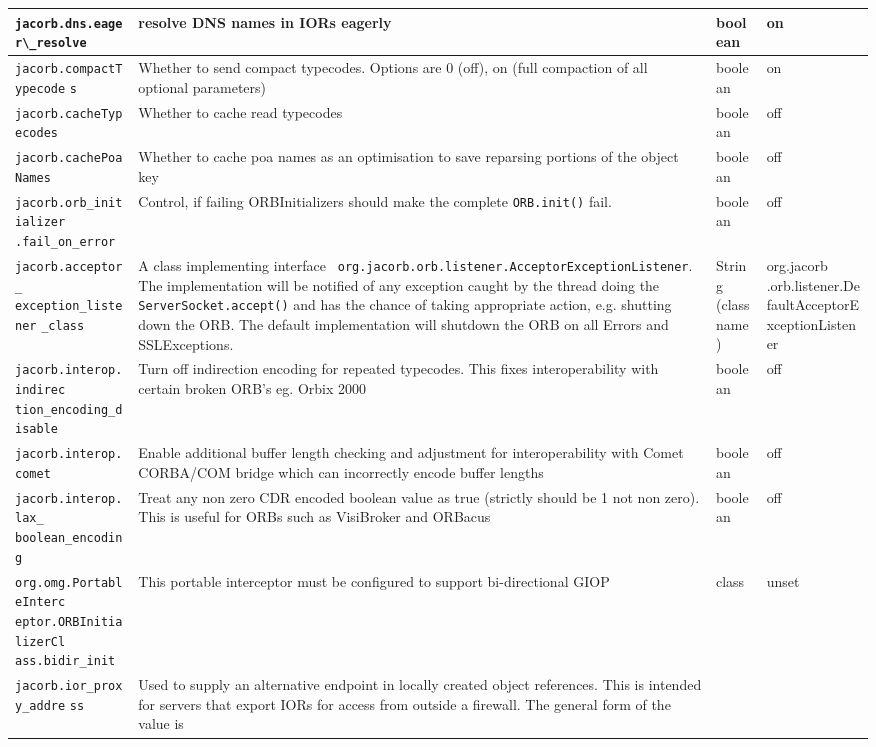{{\begin{small}
\begin{longtable}{|p{5cm}|p{7.5cm}|p{1.5cm}|p{1.5cm}|}
\verb"jacorb.dns.eager\_resolve" & resolve DNS names in IORs eagerly & boolean & on \\
\hline
\verb"jacorb.compactTypecode"
\verb"s" & Whether to send compact typecodes. Options are 0 (off), on (full compaction of all optional parameters) & boolean & on \\
\hline
\verb"jacorb.cacheTypecodes" & Whether to cache read
typecodes  & boolean & off \\
\hline
\verb"jacorb.cachePoaNames" & Whether to cache poa names as an optimisation
to save reparsing portions of the object key& boolean & off \\
\hline
\verb"jacorb.orb_initializer"
\verb".fail_on_error" & Control, if failing ORBInitializers should make the
complete {\tt ORB.init()} fail. & boolean & off \\
\hline
\verb"jacorb.acceptor_"
\verb"exception_listener"
\verb"_class" & A class implementing interface {\tt
  org.jacorb.orb.listener.AcceptorException\-Listener}. The implementation
will be notified of any exception caught by the thread doing the {\tt
  ServerSocket.accept()} and has the chance of taking appropriate action,
e.g. shutting down the ORB. The default implementation will shutdown the ORB
on all Errors and SSLExceptions. & String (classname) & org.jacorb
.orb.listener.DefaultAcceptorExceptionListener \\
\hline
\verb"jacorb.interop.indirec"
\verb"tion_encoding_disable" & Turn off indirection encoding for
repeated typecodes. This fixes interoperability with certain broken
ORB's eg. Orbix 2000 & boolean & off \\
\hline
\verb"jacorb.interop.comet" & Enable additional buffer length checking
and adjustment for interoperability with Comet CORBA/COM bridge which
can incorrectly encode buffer lengths & boolean & off
\\
\hline
\verb"jacorb.interop.lax_"
\verb"boolean_encoding" & Treat any non zero CDR encoded boolean value
as true (strictly should be 1 not non zero). This is useful for ORBs such
as VisiBroker and ORBacus & boolean & off \\
\hline
\verb"org.omg.PortableInterc"
\verb"eptor.ORBInitializerCl"
\verb"ass.bidir_init" & This portable interceptor must be configured
to support bi-directional GIOP & class & unset \\
\hline
\verb"jacorb.ior_proxy_addre"
\verb"ss" & Used to supply an alternative
endpoint in locally created object
references. This is intended for servers that export IORs for access
from outside a firewall.  The general form of the value is {\tt
}
\end{longtable}
\end{small}}}
